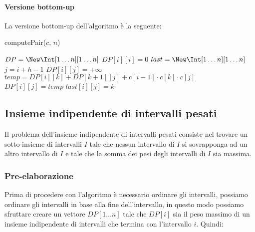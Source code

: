             \paragraph{Versione bottom-up} La versione bottom-up dell'algoritmo è la seguente:
                \begin{algorithm}
                    \caption{computePair(\Int[] $c$, \Int $n$)}
                    \begin{algorithmic}
                        \State \Int[][] $DP = \New \Int[1\dots n][1\dots n]$
                            \State $DP[i][i]=0$
                        \EndFor
                        \State \Int[][] $last = \New \Int[1\dots n][1\dots n]$
                                \State \Int $j=i+h-1$
                                \State $DP[i][j]=+\infty$
                                    \State $temp = DP[i][k]+DP[k+1][j]+c[i-1]\cdot c[k]\cdot c[j]$
                                        \State $DP[i][j]=temp$
                                        \State $last[i][j]=k$
                                    \EndIf
                                \EndFor
                            \EndFor
                        \EndFor
                    \end{algorithmic}
                \end{algorithm}
    \subsection{Insieme indipendente di intervalli pesati}
        \label{subsec:weightedInterval}
        Il problema dell'insieme indipendente di intervalli pesati consiste nel trovare un sotto-insieme di intervalli $I$ tale che nessun intervallo di $I$ si sovrapponga ad un altro intervallo di $I$ e tale che la somma dei pesi degli intervalli di $I$ sia massima.
        \subsubsection{Pre-elaborazione}
            Prima di procedere con l'algoritmo è necessario ordinare gli intervalli, possiamo ordinare gli intervalli in base alla fine dell'intervallo, in questo modo possiamo sfruttare creare un vettore $DP[1\dots n]$ tale che $DP[i]$ sia il peso massimo di un insieme indipendente di intervalli che termina con l'intervallo $i$. Quindi:
